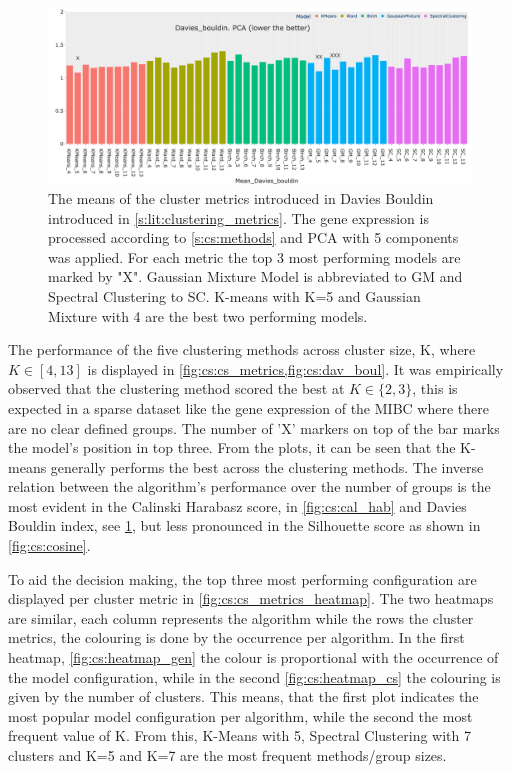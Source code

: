 \begin{figure}[!htb]    
    \centering
    \includegraphics[width=1.0\textwidth,keepaspectratio]{Sections/ClusteringAnalysis/Resources/cs_top3/PCA_top3_Davies_bouldin.png}
    \caption{The means of the cluster metrics introduced in Davies Bouldin introduced in \cref{s:lit:clustering_metrics}. The gene expression is processed according to \cref{s:cs:methods} and PCA with 5 components was applied. For each metric the top 3 most performing models are marked by "X". Gaussian Mixture Model is abbreviated to GM and Spectral Clustering to SC. K-means with K=5 and Gaussian Mixture with 4 are the best two performing models.}
    \label{fig:cs:dav_boul}
\end{figure}

The performance of the five clustering methods across cluster size, K, where $K\in[4, 13]$ is displayed in \cref{fig:cs:cs_metrics,fig:cs:dav_boul}. It was empirically observed that the clustering method scored the best at $K\in\{2,3\}$, this is expected in a sparse dataset like the gene expression of the MIBC where there are no clear defined groups.  The number of 'X' markers on top of the bar marks the model's position in top three. From the plots, it can be seen that the K-means generally performs the best across the clustering methods. The inverse relation between the algorithm's performance over the number of groups is the most evident in the Calinski Harabasz score, in \cref{fig:cs:cal_hab} and Davies Bouldin index, see \cref{fig:cs:dav_boul}, but less pronounced in the Silhouette score as shown in \cref{fig:cs:cosine}.


To aid the decision making, the top three most performing configuration are displayed per cluster metric in \cref{fig:cs:cs_metrics_heatmap}. The two heatmaps are similar, each column represents the algorithm while the rows the cluster metrics, the colouring is done by the occurrence per algorithm. In the first heatmap, \cref{fig:cs:heatmap_gen} the colour is proportional with the occurrence of the model configuration, while in the second \cref{fig:cs:heatmap_cs} the colouring is given by the number of clusters. This means, that the first plot indicates the most popular model configuration per algorithm, while the second the most frequent value of K. From this, K-Means with 5, Spectral Clustering with 7 clusters and K=5 and K=7 are the most frequent methods/group sizes. 

